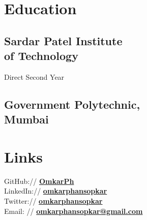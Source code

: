 \documentclass[]{deedy-resume-openfont}
\begin{document}
%
%
\lastupdated

%
%

%
%

\begin{minipage}[t]{0.37\textwidth} 


\section{Education} 
\subsection{Sardar Patel Institute \\of Technology}
Direct Second Year\\
\sectionsep
\vspace{0.1cm}
\subsection{Government Polytechnic,\\ Mumbai}
\sectionsep



\section{Links} 
GitHub:// \href{https://github.com/OmkarPh}{\bf OmkarPh} \\
LinkedIn://  \href{https://www.linkedin.com/in/omkarphansopkar}{\bf omkarphansopkar} \\
Twitter:// \href{https://twitter.com/omkarphansopkar}{\bf omkarphansopkar} \\
Email: // \href{mailto:omkarphansopkar@gmail.com}{\bf omkarphansopkar@gmail.com} \\
\sectionsep



\end{minipage}
\end{document}

